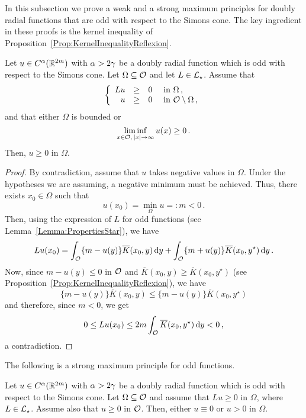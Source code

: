 In this subsection we prove a weak and a strong maximum principles for doubly radial functions that
are odd with respect to the Simons cone. The key ingredient in these proofs is the kernel
inequality of Proposition~\ref{Prop:KernelInequalityReflexion}.

\begin{proposition}
\label{Prop:WeakMaximumPrincipleForOddFunctionsRotations} Let $u\in C^{\alpha}(\mathbb{R}^{2m})$ with
$\alpha > 2\gamma$ be a doubly radial function which is odd with respect to the Simons cone. Let
$\Omega \subseteq \mathcal{O}$ and let $L \in \mathcal{L}_\star$. Assume that
$$
\left\{\begin{array}{rcll}
Lu & \geq & 0 & \text{ in } \Omega\,,\\
u & \geq & 0 & \text{ in } \mathcal{O} \setminus \Omega\,,
\end{array} \right.
$$
and that either $\Omega$ is bounded or 
$$
\liminf_{x \in \mathcal{O},\,|x|\to \infty} u(x) \geq 0\,.
$$
Then, $u \geq 0$ in $\Omega$.
\end{proposition}

\begin{proof}
By contradiction, assume that $u$ takes negative values in $\Omega$. Under the hypotheses we are
assuming, a negative minimum must be achieved. Thus, there exists $x_0\in \Omega$ such that
$$
u(x_0) = \min_{\Omega} u =: m < 0\,.
$$
Then, using the expression of $L$ for odd functions (see Lemma~\ref{Lemma:PropertiesStar}), we have
$$
Lu (x_0) = \int_{\mathcal{O}} \{m - u(y) \} \overline{K}(x_0, y) \,\mathrm{d} y +  \int_{\mathcal{O}} \{m + u(y) \} \overline{K}(x_0, y^\star) \,\mathrm{d} y\,.
$$
Now, since $m - u(y) \leq 0$ in $\mathcal{O}$ and $\overline{K}(x_0, y) \geq \overline{K}(x_0, y^\star)$ (see Proposition~\ref{Prop:KernelInequalityReflexion}), we have
$$
\{m - u(y) \} \overline{K}(x_0, y) \leq \{m - u(y) \} \overline{K}(x_0, y^\star)
$$
and therefore, since $m<0$, we get
$$
0 \leq L u(x_0) \leq 2m \int_{\mathcal{O}} \overline{K}(x_0, y^\star) \,\mathrm{d} y < 0\,,
$$
a contradiction.
\end{proof}

The following is a strong maximum principle for odd functions.

\begin{proposition}
\label{Prop:StrongMaximumPrincipleForOddFunctionsRotations} Let $u\in C^{\alpha}(\mathbb{R}^{2m})$ with
$\alpha > 2\gamma$ be a doubly radial function which is odd with respect to the Simons cone.  Let
$\Omega \subseteq \mathcal{O}$ and assume that $Lu \geq 0$ in $\Omega$, where $L \in \mathcal{L}_\star$. Assume also that $u\geq 0$ in $\mathcal{O}$.
Then, either $u\equiv 0$ or $u > 0$ in $\Omega$.
\end{proposition}

